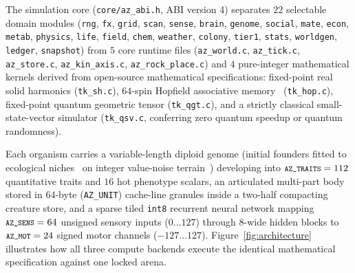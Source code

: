\documentclass[11pt,reqno]{amsart}
\newcommand{\code}[1]{\texttt{\footnotesize #1}}
\newcommand{\us}{\_\allowbreak}
\newcommand{\slsh}{/\allowbreak}
\begin{document}
The simulation core (\code{core\slsh az\us abi.h}, ABI version $4$) separates $22$ selectable domain modules (\code{rng}, \code{fx}, \code{grid}, \code{scan}, \code{sense}, \code{brain}, \code{genome}, \code{social}, \code{mate}, \code{econ}, \code{metab}, \code{physics}, \code{life}, \code{field}, \code{chem}, \code{weather}, \code{colony}, \code{tier1}, \code{stats}, \code{worldgen}, \code{ledger}, \code{snapshot}) from $5$ core runtime files (\code{az\us world.c}, \code{az\us tick.c}, \code{az\us store.c}, \code{az\us kin\us axis.c}, \code{az\us rock\us place.c}) and $4$ pure-integer mathematical kernels derived from open-source mathematical specifications: fixed-point real solid harmonics (\code{tk\us sh.c}), $64$-spin Hopfield associative memory~\cite{hopfield1982neural} (\code{tk\us hop.c}), fixed-point quantum geometric tensor (\code{tk\us qgt.c}), and a strictly classical small-state-vector simulator (\code{tk\us qsv.c}, conferring zero quantum speedup or quantum randomness).

Each organism carries a variable-length diploid genome (initial founders fitted to ecological niches~\cite{hutchinson1957concluding} on integer value-noise terrain~\cite{perlin1985image}) developing into $\code{AZ\us TRAITS} = 112$ quantitative traits and $16$ hot phenotype scalars, an articulated multi-part body stored in $64$-byte (\code{AZ\us UNIT}) cache-line granules inside a two-half compacting creature store, and a sparse tiled \code{int8} recurrent neural network mapping $\code{AZ\us SENS} = 64$ unsigned sensory inputs ($0\dots 127$) through $8$-wide hidden blocks to $\code{AZ\us MOT} = 24$ signed motor channels ($-127\dots 127$). Figure~\ref{fig:architecture} illustrates how all three compute backends execute the identical mathematical specification against one locked arena.
\end{document}
